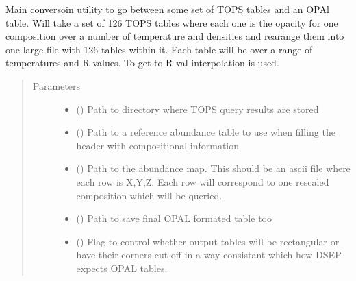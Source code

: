 \documentclass[letterpaper,10pt,english]{sphinxmanual}
\begin{document}
\begin{fulllineitems}
\label{\detokenize{pyTOPSScrape.api:pyTOPSScrape.api.convert.TOPS_2_OPAL}}
\sphinxAtStartPar
Main conversoin utility to go between some set of TOPS tables and an OPAl
table. Will take a set of 126 TOPS tables where each one is the opacity for
one composition over a number of temperature and densities and rearange them
into one large file with 126 tables within it. Each table will be over a
range of temperatures and R values. To get to R val interpolation is used.
\begin{quote}\begin{description}
\item[{Parameters}] \leavevmode\begin{itemize}
\item {} 
\sphinxAtStartPar
{} () \textendash{} Path to directory where TOPS query results are stored

\item {} 
\sphinxAtStartPar
{} () \textendash{} Path to a reference abundance table to use when filling the header
with compositional information

\item {} 
\sphinxAtStartPar
{} () \textendash{} Path to the abundance map. This should be an ascii file where each
row is X,Y,Z. Each row will correspond to one rescaled composition
which will be queried.

\item {} 
\sphinxAtStartPar
{} () \textendash{} Path to save final OPAL formated table too

\item {} 
\sphinxAtStartPar
{} (\sphinxstyleliteralemphasis{\sphinxupquote{, }}) \textendash{} Flag to control whether output tables will be rectangular or have
their corners cut off in a way consistant which how DSEP expects
OPAL tables.

\end{itemize}

\end{description}\end{quote}

\end{fulllineitems}
\end{document}
